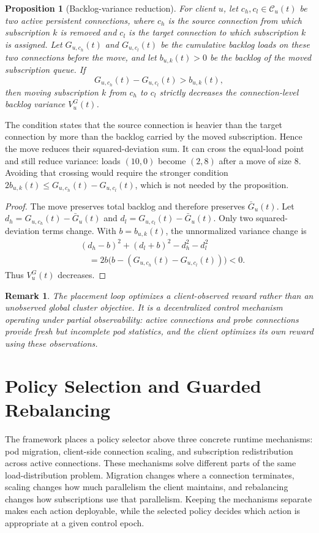 \documentclass[manuscript,nonacm]{acmart}
\newtheorem{proposition}{Proposition}
\newtheorem{remark}{Remark}
\begin{document}
\begin{proposition}[Backlog-variance reduction]
For client $u$, let $c_h,c_l\in\mathcal{C}_u(t)$ be two active persistent
connections, where $c_h$ is the source connection from which subscription $k$
is removed and $c_l$ is the target connection to which subscription $k$ is
assigned. Let $G_{u,c_h}(t)$ and $G_{u,c_l}(t)$ be the cumulative backlog loads
on these two connections before the move, and let $b_{u,k}(t)>0$ be the backlog
of the moved subscription queue. If
\begin{equation}
	G_{u,c_h}(t)-G_{u,c_l}(t)>b_{u,k}(t),
\end{equation}
then moving subscription $k$ from $c_h$ to $c_l$ strictly decreases the
connection-level backlog variance $V^G_u(t)$.
\end{proposition}

The condition states that the source connection is heavier than the target
connection by more than the backlog carried by the moved subscription. Hence
the move reduces their squared-deviation sum. It can cross the equal-load
point and still reduce variance: loads $(10,0)$ become $(2,8)$ after a move
of size 8. Avoiding that crossing would require the stronger condition
$2b_{u,k}(t)\leq G_{u,c_h}(t)-G_{u,c_l}(t)$, which is not needed by the proposition.

\begin{proof}
The move preserves total backlog and therefore preserves $\bar{G}_u(t)$. Let
$d_h=G_{u,c_h}(t)-\bar{G}_u(t)$ and
$d_l=G_{u,c_l}(t)-\bar{G}_u(t)$. Only two squared-deviation terms change. With
$b=b_{u,k}(t)$, the unnormalized variance change is
\begin{align}
	&(d_h-b)^2+(d_l+b)^2-d_h^2-d_l^2 \nonumber\\
	&\quad =
	2b\bigl(b-(G_{u,c_h}(t)-G_{u,c_l}(t))\bigr)<0.
\end{align}
Thus $V^G_u(t)$ decreases.
\end{proof}

\begin{remark}
The placement loop optimizes a client-observed reward rather than an
unobserved global cluster objective. It is a decentralized control mechanism operating
under partial observability: active connections and probe connections provide
fresh but incomplete pod statistics, and the client optimizes its own reward
using these observations.
\end{remark}

\section{Policy Selection and Guarded Rebalancing}
The framework places a policy selector above three concrete runtime mechanisms:
pod migration, client-side connection scaling, and subscription redistribution
across active connections. These mechanisms solve different parts of the same
load-distribution problem. Migration changes where a connection terminates,
scaling changes how much parallelism the client maintains, and rebalancing
changes how subscriptions use that parallelism. Keeping the mechanisms
separate makes each action deployable, while the selected policy decides which
action is appropriate at a given control epoch.
\end{document}
